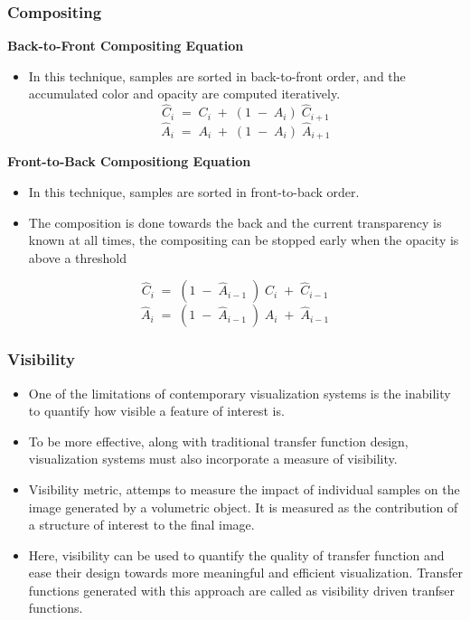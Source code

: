 \documentclass{beamer}
\begin{document}
\begin{frame}
\frametitle{Compositing}
\textbf{Back-to-Front Compositing Equation}
\begin{itemize}
\item In this technique, samples are sorted in back-to-front order, and the accumulated color and opacity are computed iteratively.
\begin{equation}
\hat{C}_i \; = \; C_i \; + \; (1 \; - \; A_i ) \; \hat{C}_{i+1} 
\end{equation}
\begin{equation}
\hat{A}_i \; = \; A_i \; + \; (1 \; - \; A_i ) \; \hat{A}_{i+1} 
\end{equation}
\end{itemize}
\textbf{Front-to-Back Compositiong Equation}
\begin{itemize}
\item In this technique, samples are sorted in front-to-back order.
\item The composition is done towards the back and the current transparency is known at all times, the compositing can be stopped early when the opacity is above a threshold
\end{itemize}
\begin{equation}
\hat{C}_i \; = \; (1 \; - \; \hat{A}_{i-1} \; ) \; C_i \; + \; \hat{C}_{i-1}    
\end{equation}
\begin{equation}
\hat{A}_i \; = \; (1 \; - \; \hat{A}_{i-1} \; ) \; A_i \; + \; \hat{A}_{i-1}    
\end{equation}
\end{frame}



\begin{frame}
\frametitle{ Visibility}
\begin{itemize}
\item One of the limitations of contemporary visualization systems is the inability to quantify how visible a feature of interest is. 
\item To be more effective, along with traditional transfer function design, visualization systems must also incorporate a measure of visibility.
\item Visibility metric, attemps to measure the impact of individual samples on the image generated by a volumetric object. It is measured as the contribution of a structure of interest to the final image.
\item Here, visibility can be used to quantify the quality of transfer function and ease their design towards more meaningful and efficient visualization. Transfer functions generated with this approach are called as visibility driven tranfser functions.
\end{itemize}
\end{frame}
\end{document}
